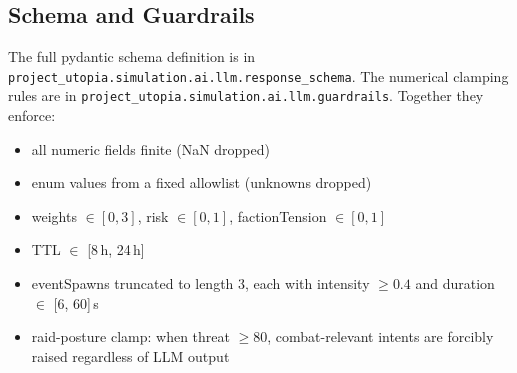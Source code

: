 \subsection{Schema and Guardrails}

The full pydantic schema definition is in
\texttt{project\_utopia.simulation.ai.llm.response\_schema}. The
numerical clamping rules are in
\texttt{project\_utopia.simulation.ai.llm.guardrails}. Together
they enforce:
\begin{itemize}[leftmargin=*]
\item all numeric fields finite (NaN dropped)
\item enum values from a fixed allowlist (unknowns dropped)
\item weights $\in [0, 3]$, risk $\in [0, 1]$,
factionTension $\in [0, 1]$
\item TTL $\in$ [8\,h, 24\,h]
\item eventSpawns truncated to length 3, each with intensity
$\geq 0.4$ and duration $\in$ [6, 60]\,s
\item raid-posture clamp: when threat $\geq 80$, combat-relevant
intents are forcibly raised regardless of LLM output
\end{itemize}
